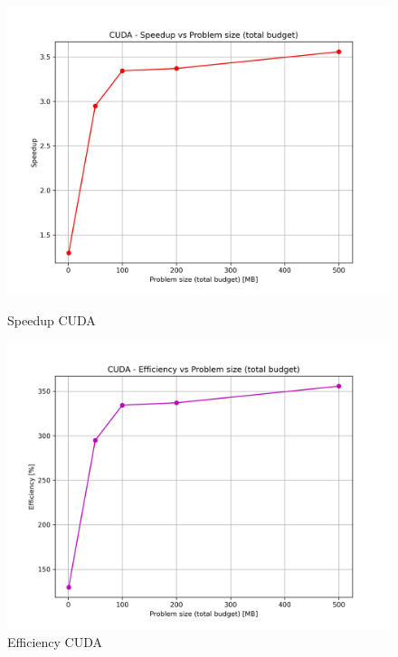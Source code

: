 			\begin{figure}[H]
				\centering
				\begin{minipage}[t]{0.49\textwidth}
					\centering
					\includegraphics[width=\textwidth]{img/cuda_plots/cuda_speedup.jpg}
					\caption{Speedup CUDA}
					\label{fig:cuda_speedup}
				\end{minipage}
				\hfill
				\begin{minipage}[t]{0.49\textwidth}
					\centering
					\includegraphics[width=\textwidth]{img/cuda_plots/cuda_efficiency.jpg}
					\caption{Efficiency CUDA}
					\label{fig:cuda_efficiency}
				\end{minipage}
			\end{figure}
			

